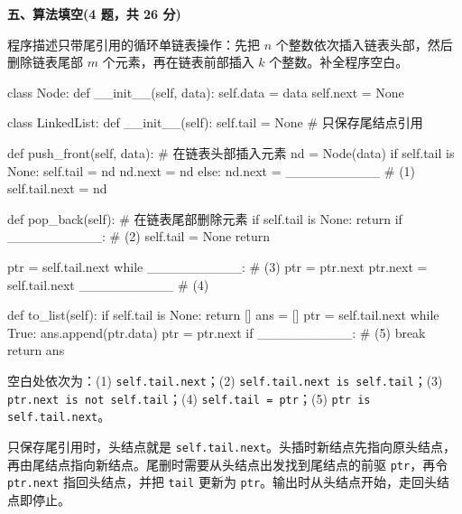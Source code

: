 \textbf{五、算法填空(4 题，共 26 分)}

\begin{question}[只带尾引用的循环单链表]
程序描述只带尾引用的循环单链表操作：先把 $n$ 个整数依次插入链表头部，然后删除链表尾部 $m$ 个元素，再在链表前部插入 $k$ 个整数。补全程序空白。

\begin{pycode}
class Node:
    def __init__(self, data):
        self.data = data
        self.next = None


class LinkedList:
    def __init__(self):
        self.tail = None        # 只保存尾结点引用

    def push_front(self, data): # 在链表头部插入元素
        nd = Node(data)
        if self.tail is None:
            self.tail = nd
            nd.next = nd
        else:
            nd.next = __________                # (1)
            self.tail.next = nd

    def pop_back(self):         # 在链表尾部删除元素
        if self.tail is None:
            return
        if __________:                          # (2)
            self.tail = None
            return

        ptr = self.tail.next
        while __________:                       # (3)
            ptr = ptr.next
        ptr.next = self.tail.next
        __________                              # (4)

    def to_list(self):
        if self.tail is None:
            return []
        ans = []
        ptr = self.tail.next
        while True:
            ans.append(ptr.data)
            ptr = ptr.next
            if __________:                      # (5)
                break
        return ans
\end{pycode}
\begin{solution}
空白处依次为：(1) \texttt{self.tail.next}；(2) \texttt{self.tail.next is self.tail}；(3) \texttt{ptr.next is not self.tail}；(4) \texttt{self.tail = ptr}；(5) \texttt{ptr is self.tail.next}。

只保存尾引用时，头结点就是 \texttt{self.tail.next}。头插时新结点先指向原头结点，再由尾结点指向新结点。尾删时需要从头结点出发找到尾结点的前驱 \texttt{ptr}，再令 \texttt{ptr.next} 指回头结点，并把 \texttt{tail} 更新为 \texttt{ptr}。输出时从头结点开始，走回头结点即停止。
\end{solution}
\end{question}


